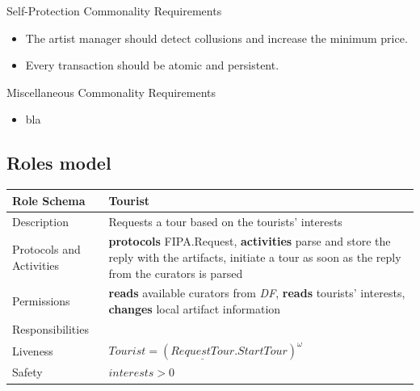 \documentclass[a4paper, 11pt]{article}
\begin{document}
Self-Protection Commonality Requirements
\begin{itemize}
\item The artist manager should detect collusions and increase the minimum price.
\item Every transaction should be atomic and persistent.
\end{itemize}

Miscellaneous Commonality Requirements
\begin{itemize}
\item bla
\end{itemize}

\subsection{Roles model}

\begin{table}[H]
	\label{my-label}
	\begin{tabular}{l p{7cm}}
		\hline
		Role Schema              & Tourist \\
		\hline
		Description              & Requests a tour based on the tourists' interests \\
		Protocols and Activities & \textbf{protocols} FIPA.Request, \textbf{activities} parse and store the reply with the artifacts, initiate a tour as soon as the reply from the curators is parsed \\
		Permissions              & \textbf{reads} available curators from \textit{DF}, \textbf{reads} tourists' interests, \textbf{changes} local artifact information \\
		\hline
		Responsibilities         &                   \\
		Liveness                 & \(Tourist=(\underline{RequestTour}.StartTour)^\omega \) \\
		Safety                   & \(interests > 0 \) \\
		\hline
	\end{tabular}
\end{table}
\end{document}
